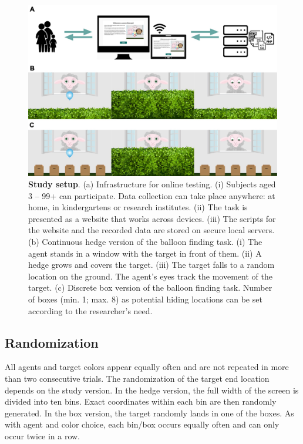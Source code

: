 \documentclass[
  man,floatsintext]{apa6}
\begin{document}
\begin{figure}

{\centering \includegraphics[width=1\linewidth]{../figures/gafo_procedure} 

}

\caption{\textbf{Study setup}.
(a) Infrastructure for online testing. (i) Subjects aged 3 -- 99+ can participate. Data collection can take place anywhere: at home, in kindergartens or research institutes. (ii) The task is presented as a website that works across devices. (iii) The scripts for the website and the recorded data are stored on secure local servers.
(b) Continuous hedge version of the balloon finding task. (i) The agent stands in a window with the target in front of them. (ii) A hedge grows and covers the target. (iii) The target falls to a random location on the ground. The agent's eyes track the movement of the target.
(c) Discrete box version of the balloon finding task. Number of boxes (min. 1; max. 8) as potential hiding locations can be set according to the researcher's need.}\label{fig:fig1}
\end{figure}

\hypertarget{randomization}{%
\subsection{Randomization}\label{randomization}}

All agents and target colors appear equally often and are not repeated in more than two consecutive trials. The randomization of the target end location depends on the study version. In the hedge version, the full width of the screen is divided into ten bins. Exact coordinates within each bin are then randomly generated. In the box version, the target randomly lands in one of the boxes. As with agent and color choice, each bin/box occurs equally often and can only occur twice in a row.
\end{document}
